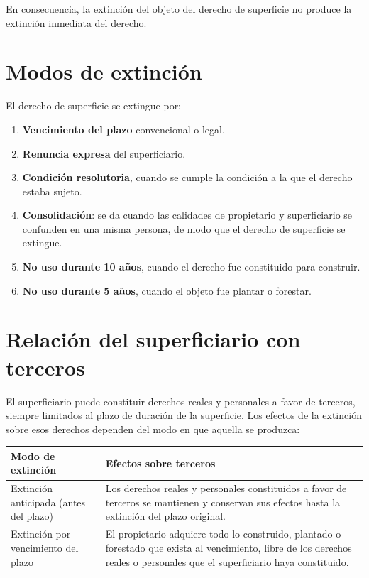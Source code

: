 \documentclass[12pt,oneside]{book}
\begin{document}
En consecuencia, la extinción del objeto del derecho de superficie no produce la extinción inmediata del derecho.

\section{Modos de extinción}

El derecho de superficie se extingue por:

\begin{enumerate}
    \item \textbf{Vencimiento del plazo} convencional o legal.
    \item \textbf{Renuncia expresa} del superficiario.
    \item \textbf{Condición resolutoria}, cuando se cumple la condición a la que el derecho estaba sujeto.
    \item \textbf{Consolidación}: se da cuando las calidades de propietario y superficiario se confunden en una misma persona, de modo que el derecho de superficie se extingue.
    \item \textbf{No uso durante 10 años}, cuando el derecho fue constituido para construir.
    \item \textbf{No uso durante 5 años}, cuando el objeto fue plantar o forestar.
\end{enumerate}

\section{Relación del superficiario con terceros}

El superficiario puede constituir derechos reales y personales a favor de terceros, siempre limitados al plazo de duración de la superficie. Los efectos de la extinción sobre esos derechos dependen del modo en que aquella se produzca:

\begin{table}[H]
\centering
\renewcommand{\arraystretch}{1.3}
\begin{tabularx}{\textwidth}{
    >{\raggedright\arraybackslash}p{}
    >{\raggedright\arraybackslash}X
}
\toprule
\textbf{Modo de extinción} & \textbf{Efectos sobre terceros} \\
\midrule
Extinción anticipada (antes del plazo) &
Los derechos reales y personales constituidos a favor de terceros se mantienen y conservan sus efectos hasta la extinción del plazo original. \\
\midrule
Extinción por vencimiento del plazo &
El propietario adquiere todo lo construido, plantado o forestado que exista al vencimiento, libre de los derechos reales o personales que el superficiario haya constituido. \\
\bottomrule
\end{tabularx}
\end{table}
\end{document}
